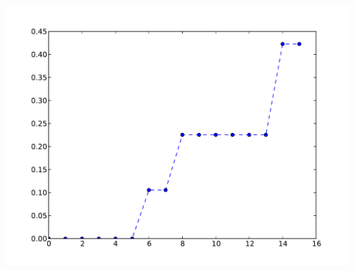 \documentclass[letterpaper,10pt,english]{sphinxmanual}
\begin{document}
\begin{fulllineitems}
\includegraphics{index-2.pdf}

\end{fulllineitems}

\end{document}
